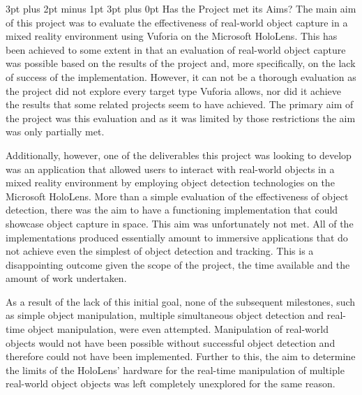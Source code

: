 \documentclass[12pt,a4paper,oneside]{article}
\makeatletter
\renewcommand\subsection{\@startsection {subsection}{1}{0mm} %
                               {3pt plus 2pt minus 1pt} %
                               {3pt plus 0pt} %
                               {\large\bfseries}}
\makeatother
\begin{document}
\subsection{Has the Project met its Aims?}
The main aim of this project was to evaluate the effectiveness of real-world object capture in a mixed reality environment using Vuforia on the Microsoft HoloLens. This has been achieved to some extent in that an evaluation of real-world object capture was possible based on the results of the project and, more specifically, on the lack of success of the implementation. However, it can not be a thorough evaluation as the project did not explore every target type Vuforia allows, nor did it achieve the results that some related projects seem to have achieved. The primary aim of the project was this evaluation and as it was limited by those restrictions the aim was only partially met.

Additionally, however, one of the deliverables this project was looking to develop was an application that allowed users to interact with real-world objects in a mixed reality environment by employing object detection technologies on the Microsoft HoloLens. More than a simple evaluation of the effectiveness of object detection, there was the aim to have a functioning implementation that could showcase object capture in space. This aim was unfortunately not met. All of the implementations produced essentially amount to immersive applications that do not achieve even the simplest of object detection and tracking. This is a disappointing outcome given the scope of the project, the time available and the amount of work undertaken.

As a result of the lack of this initial goal, none of the subsequent milestones, such as simple object manipulation, multiple simultaneous object detection and real-time object manipulation, were even attempted. Manipulation of real-world objects would not have been possible without successful object detection and therefore could not have been implemented. Further to this, the aim to determine the limits of the HoloLens' hardware for the real-time manipulation of multiple real-world object objects was left completely unexplored for the same reason.
\end{document}
